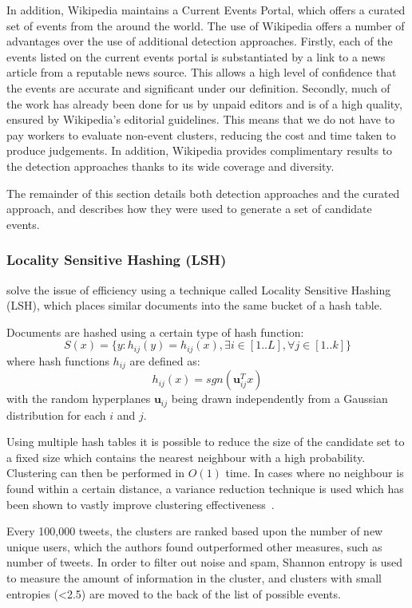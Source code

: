 In addition, Wikipedia maintains a Current Events Portal, which offers a curated set of events from the around the world.
The use of Wikipedia offers a number of advantages over the use of additional detection approaches.
Firstly, each of the events listed on the current events portal is substantiated by a link to a news article from a reputable news source.
This allows a high level of confidence that the events are accurate and significant under our definition.
Secondly, much of the work has already been done for us by unpaid editors and is of a high quality, ensured by Wikipedia's editorial guidelines.
This means that we do not have to pay workers to evaluate non-event clusters, reducing the cost and time taken to produce judgements.
In addition, Wikipedia provides complimentary results to the detection approaches thanks to its wide coverage and diversity.

The remainder of this section details both detection approaches and the curated approach, and describes how they were used to generate a set of candidate events.

\subsubsection{Locality Sensitive Hashing (LSH)}
\cite{Petrovic:2010:SFS:1857999.1858020} solve the issue of efficiency using a technique called Locality Sensitive Hashing (LSH), which places similar documents into the same bucket of a hash table.

Documents are hashed using a certain type of hash function:
\[
S(x) = \{y : h_{ij}(y) = h_{ij}(x), \exists i \in [1..L], \forall j \in [1..k]\}
\]
where hash functions \(h_{ij}\) are defined as:
\[
h_{ij}(x) = sgn( \textbf{u}_{ij}^Tx)
\]
with the random hyperplanes \(\textbf{u}_{ij}\) being drawn independently from a Gaussian distribution for each \(i\) and \(j\).

Using multiple hash tables it is possible to reduce the size of the candidate set to a fixed size which contains the nearest neighbour with a high probability.
Clustering can then be performed in \(O(1)\) time.
In cases where no neighbour is found within a certain distance, a variance reduction technique is used which has been shown to vastly improve clustering effectiveness~\citep{Petrovic:2010:SFS:1857999.1858020}.

Every 100,000 tweets, the clusters are ranked based upon the number of new unique users, which the authors found outperformed other measures, such as number of tweets.
In order to filter out noise and spam, Shannon entropy is used to measure the amount of information in the cluster, and clusters with small entropies (\textless 2.5) are moved to the back of the list of possible events.


